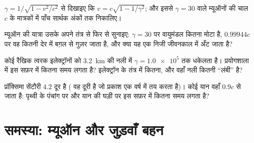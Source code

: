 \begin{exercise}[$\star\star\star$]\label{exo:g12:special-relativity:12}
$\gamma = 1/\sqrt{1 - v^2/c^2}$ से दिखाइए कि $v = c\sqrt{1 - 1/\gamma^2}$; और इससे $\gamma = 30$ वाले म्यूऑनों की चाल $c$ के
मात्रकों में पाँच सार्थक अंकों तक निकालिए।
\end{exercise}

\begin{exercise}[$\star\star\star$]\label{exo:g12:special-relativity:13}
म्यूऑन की यात्रा उसके अपने तंत्र से फिर से सुनाइए: $\gamma = 30$ पर वायुमंडल कितना
मोटा है, $0.99944c$ पर वह कितनी देर में बग़ल से गुज़र जाता है, और क्या यह एक निजी
जीवनकाल में अँट जाता है?
\end{exercise}

\begin{exercise}[$\star\star\star$]\label{exo:g12:special-relativity:14}
कोई रैखिक त्वरक इलेक्ट्रॉनों को \qty{3.2}{km} की नली में $\gamma = \num{1.0e5}$ तक धकेलता है।
प्रयोगशाला में इस सफ़र में कितना समय लगता है? इलेक्ट्रॉन के तंत्र में कितना, और
वहाँ नली कितनी ``लंबी'' है?
\end{exercise}

\begin{exercise}[$\star\star\star$]\label{exo:g12:special-relativity:15}
प्रॉक्सिमा सेंटौरी $4.2$  दूर है ( वह
दूरी है जो प्रकाश एक वर्ष में तय करता है)। कोई यान वहाँ $0.9c$ से जाता है:
पृथ्वी के पंचांग पर और यान की घड़ी पर इस सफ़र में कितना समय लगता है?
\end{exercise}

\section{समस्या: म्यूऑन और जुड़वाँ बहन}

